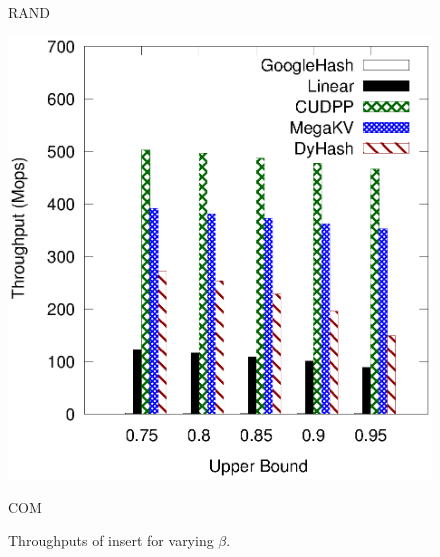 \begin{figure}[h]
\begin{minipage}{0.19\linewidth}
		\centerline{RAND}
	\end{minipage}
	\hfill
	\begin{minipage}{0.19\linewidth}\centering
		\includegraphics[width=\linewidth]{pic/static-upper/upper_insert_ali.eps}
		\centerline{COM}
	\end{minipage}
	\caption{Throughputs of insert for varying $\beta$.}
	\label{fig:static:all:insert}
\end{figure}
